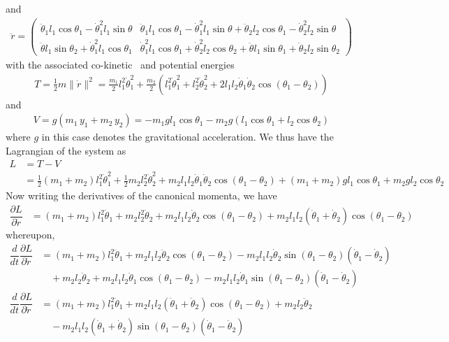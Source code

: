 %
and
%
\begin{align}
\ddot{r} = \left(\begin{array}{c|c}
\ddot{\theta}_1 l_1 \cos \theta_1 - \dot{\theta}_1^2 l_1 \sin \theta  & \ddot{\theta}_1 l_1 \cos \theta_1 - \dot{\theta}_1^2 l_1 \sin \theta  + \ddot{\theta}_2 l_2 \cos \theta_1 - \dot{\theta}_2^2 l_2 \sin \theta
\\
\ddot{\theta} l_1  \sin \theta_2 + \dot{\theta}_1^2 l_1 \cos \theta_1  & 
\dot{\theta}_1^2 l_1 \cos \theta_1  + \dot{\theta}_2^2 l_2 \cos \theta_2  + \ddot{\theta}l_1 \sin \theta_1 + \ddot{\theta}_2 l_2 \sin \theta_2 
\end{array}\right)
\end{align}
%
with the associated co-kinetic~\cite{Stramigioli2001} and potential energies
%
\begin{align}
	T = \frac{1}{2} m \|\dot{r}\|^2 = \frac{m_1}{2}l_1^2 \dot{\theta}_1^2 + \frac{m_2}{2}\left(l_1^2 \dot{\theta}_1^2 + l_2^2 \dot{\theta}_2^2 + 2 l_1 l_2 \dot{\theta}_1 \dot{\theta}_2 \cos(\theta_1 - \theta_2) \right)
\end{align}
%
and
%
\begin{align}
	V = g(m_1 \, y_1 + m_2\, y_2) = -m_1gl_1 \cos \theta_1 - m_2 g \left(l_1 \cos \theta_1 + l_2 \cos \theta_2\right)
\end{align}
%
where $g$ in this case denotes the gravitational acceleration.
%
We thus have the Lagrangian of the system as 
%
\begin{align}
	L & = T - V \nonumber \\
	  & = \frac{1}{2}(m_1 + m_2)l_1^2 \dot{\theta}_1^2 + \frac{1}{2}m_2 l_2^2 \dot{\theta}_2^2 + m_2l_1 l_2 \dot{\theta}_1 \dot{\theta}_2 \cos(\theta_1 - \theta_2) + (m_1 + m_2) g l_1 \cos \theta_1 + m_2 g l_2 \cos \theta_2 
\end{align}
%
Now writing the derivatives of the canonical momenta, we have
%
\begin{align}
\dfrac{\partial L}{\partial \dot{r}} &=  (m_1+m_2)l_1^2 \dot{\theta}_1 + m_2 l_2^2 \dot{\theta}_2 + m_2 l_1 l_2 \dot{\theta}_2 \cos(\theta_1 - \theta_2) + m_2 l_1 l_2 (\dot{\theta}_1 + \dot{\theta}_2 )  \cos(\theta_1 - \theta_2) 
\end{align}
%
whereupon, 
%
\begin{align}
	\dfrac{d}{dt}\dfrac{\partial L}{\partial \dot{r}} &=  (m_1+m_2)l_1^2 \ddot{\theta}_1 + m_2 l_1 l_2 \ddot{\theta}_2 \cos(\theta_1 - \theta_2) -  m_2 l_1 l_2 \dot{\theta}_2 \sin(\theta_1 - \theta_2) (\dot{\theta}_1 - \dot{\theta}_2) \nonumber \\
	& \quad + m_2 l_2 \ddot{\theta}_2 + m_2 l_1 l_2 \ddot{\theta}_1 \cos(\theta_1 - \theta_2) - m_2 l_1 l_2 \dot{\theta}_1 \sin (\theta_1 - \theta_2)(\dot{\theta}_1 - \dot{\theta}_2) \\
	\dfrac{d}{dt}\dfrac{\partial L}{\partial \dot{r}} &= (m_1+m_2)l_1^2 \ddot{\theta}_1 + m_2 l_1 l_2 (\ddot{\theta}_1 + \ddot{\theta}_2) \cos(\theta_1 - \theta_2)  + m_2 l_2 \ddot{\theta}_2  \nonumber \\
	& \quad-  m_2 l_1 l_2(\dot{\theta}_1 + \dot{\theta}_2) \sin(\theta_1 - \theta_2) (\dot{\theta}_1 - \dot{\theta}_2) 
\end{align}
